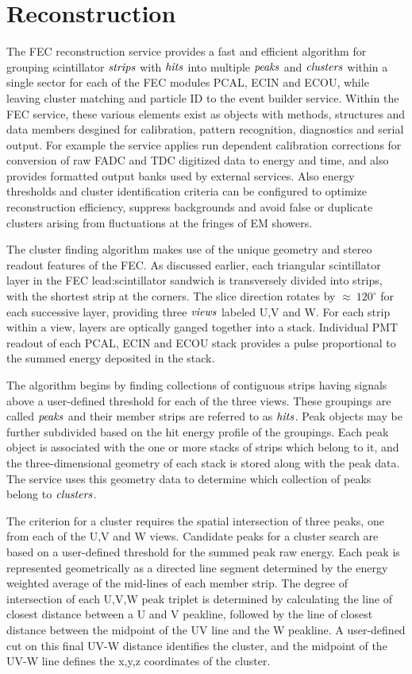 \section{Reconstruction}

The FEC reconstruction service provides a fast and efficient algorithm for grouping scintillator $\it{strips}$ with $\it{hits}$ into multiple $\it{peaks}$ and $\it{clusters}$ within a single sector for each of the FEC modules PCAL, ECIN and ECOU, while leaving cluster matching and particle ID to the event builder service.  Within the FEC service, these various elements exist as objects with methods, structures and data members desgined for calibration, pattern recognition, diagnostics and serial output.  For example the service applies run dependent calibration corrections for conversion of raw FADC and TDC digitized data to energy and time, and also provides formatted output banks used by external services.  Also energy thresholds and cluster identification criteria can be configured to optimize reconstruction efficiency, suppress backgrounds and avoid false or duplicate clusters arising from fluctuations at the fringes of EM showers. 

The cluster finding algorithm makes use of the unique geometry and stereo readout features of the FEC. As discussed earlier, each triangular scintillator layer in the FEC lead:scintillator sandwich is transversely divided into strips, with the shortest strip at the corners. The slice direction rotates by $\approx~120^{\circ}$ for each successive layer, providing three $\it{views}$ labeled U,V and W.  For each strip within a view, layers are optically ganged together into a stack.  Individual PMT readout of each PCAL, ECIN and ECOU stack provides a pulse proportional to the summed energy deposited in the stack.

The algorithm begins by finding collections of contiguous strips having signals above a user-defined threshold for each of the three views. These groupings are called $\it{peaks}$ and their member strips are referred to as $\it{hits}$.  Peak objects may be further subdivided based on the hit energy profile of the groupings.  Each peak object is associated with the one or more stacks of strips which belong to it, and the three-dimensional geometry of each stack is stored along with the peak data.  The service uses this geometry data to determine which collection of peaks belong to $\it{clusters}$. 

The criterion for a cluster requires the spatial intersection of three peaks, one from each of the U,V and W views.  Candidate peaks for a cluster search are based on a user-defined threshold for the summed peak raw energy.  Each peak is represented geometrically as a directed line segment determined by the energy weighted average of the mid-lines of each member strip.   The degree of intersection of each U,V,W peak triplet is determined by calculating the line of closest distance between a U and V peakline, followed by the line of closest distance between the midpoint of the UV line and the W peakline.  A user-defined cut on this final UV-W distance identifies the cluster, and the midpoint of the UV-W line defines the x,y,z coordinates of the cluster.  

